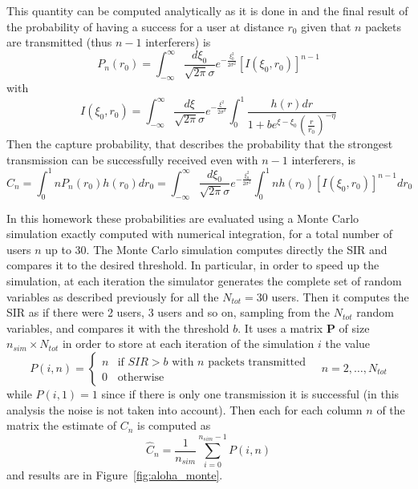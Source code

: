 \documentclass[10pt]{article}
\begin{document}
This quantity can be computed analytically as it is done in \cite{capture} and the final result of the probability of having a success for a user at distance $r_0$ given that $n$ packets are transmitted (thus $n-1$ interferers) is
\begin{equation}
  P_n(r_0) = \int_{-\infty}^{\infty} \frac{d\xi_0}{\sqrt{2\pi}\sigma} e^{-\frac{\xi_0^2}{2\sigma^2}}[I(\xi_0, r_0)]^{n-1}
\end{equation}
with 
\begin{equation}
  I(\xi_0, r_0) = \int_{-\infty}^{\infty} \frac{d\xi}{\sqrt{2\pi}\sigma}e^{-\frac{\xi^2}{2\sigma^2}} \int_{0}^{1} \frac{h(r) dr}{1+be^{\xi - \xi_0}\left(\frac{r}{r_0}\right)^{-\eta}}
  \label{eq:I}
\end{equation}
Then the capture probability, that describes the probability that the strongest transmission can be successfully received even with $n-1$ interferers, is
\begin{equation}
  C_n = \int_0^1 nP_n(r_0)h(r_0) dr_0 = \int_{-\infty}^{\infty} \frac{d\xi_0}{\sqrt{2\pi}\sigma} e^{-\frac{\xi_0^2}{2\sigma^2}} \int_0^1 n h(r_0) [I(\xi_0, r_0)]^{n-1} dr_0
  \label{eq:cn}
\end{equation}

In this homework these probabilities are evaluated using a Monte Carlo simulation exactly computed with numerical integration, for a total number of users $n$ up to 30. The Monte Carlo simulation computes directly the SIR and compares it to the desired threshold. In particular, in order to speed up the simulation, at each iteration the simulator generates the complete set of random variables as described previously for all the $N_{tot} = 30$ users. Then it computes the SIR as if there were 2 users, 3 users and so on, sampling from the $N_{tot}$ random variables, and compares it with the threshold $b$. It uses a matrix $\mathbf{P}$ of size $n_{sim} \times N_{tot}$ in order to store at each iteration of the simulation $i$ the value
\begin{equation}
P(i, n) = 
\begin{cases}
  n & \mbox{if } SIR > b \mbox{ with } n \mbox{ packets transmitted}\\
  0 & \mbox{otherwise}
\end{cases}
 \quad n = 2, \dots, N_{tot}
\end{equation}
while $P(i, 1) = 1$ since if there is only one transmission it is successful (in this analysis the noise is not taken into account).
Then each for each column $n$ of the matrix the estimate of $C_n$ is computed as
\begin{equation}
  \hat{C}_n = \frac{1}{n_{sim}} \sum_{i = 0}^{n_{sim} - 1} P(i, n)
\end{equation}
and results are in Figure~\ref{fig:aloha_monte}.
\end{document}
